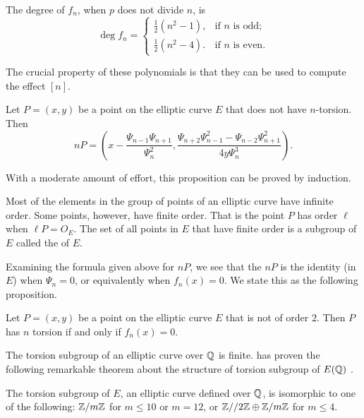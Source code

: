 \begin{proposition}
The degree of $f_n$, when $p$ does not divide $n$, is
\[
\deg f_n = 
  \begin{cases}
    \frac{1}{2}(n^2 -1), & \mbox{if $n$ is odd;} \\ %
    \frac{1}{2}(n^2-4).  & \mbox{if $n$ is even.}
  \end{cases}
\]
\end{proposition}

The crucial property of these polynomials is that they can be used to
compute the effect $[n]$.

\begin{proposition}\label{Ell:nMult:Prop}
Let $P= (x, y)$ be a point on the elliptic curve $E$
that does not have $n$-torsion.  Then
\[
nP = \left(x - \frac{\Psi_{n-1} \Psi_{n+1}}{\Psi_n^2},
\frac{\Psi_{n+2} \Psi_{n-1}^2 - \Psi_{n-2} \Psi_{n+1}^2}{4y \Psi_n^3}\right).
\]
\end{proposition}

With a moderate amount of effort, this proposition can be proved by
induction. 

Most of the elements in the group of points of an elliptic curve have
infinite order.  Some points, however, have finite order.  That is the
point $P$ has order $\ell$ when $\ell P = O_E$.  The set of all points
in $E$ that have finite order is a subgroup of $E$ called the
 of $E$.

Examining the formula given above for $nP$, we see that the $nP$ is
the identity (in $E$) when $\Psi_n = 0$, or equivalently when $f_n(x)
= 0$.  We state this as the following proposition.

\begin{proposition} \label{TorsionCriteria:Prop} 
Let $P = (x, y)$ be a point on the elliptic curve $E$ that is not of
order $2$.  Then $P$ has $n$ torsion if and only if $f_n(x)=0$.
\end{proposition}

The torsion subgroup of an elliptic curve over $\mathbb{Q}$ is finite.
{\Mazur} has proven the following remarkable theorem about the
structure of torsion subgroup of $E(\mathbb{Q})$ \cite{Mazur77,Mazur78}.

\begin{proposition}[{\Mazur}]
The torsion subgroup of $E$, an elliptic curve defined over $\mathbb{Q}$, is
isomorphic to one of the following: $\mathbb{Z}/m\mathbb{Z}$ for $m\le 10$ or $m=12$,
or $\mathbb{Z}//2\mathbb{Z} \oplus \mathbb{Z}/m\mathbb{Z}$ for $m\le 4$.
\end{proposition}

